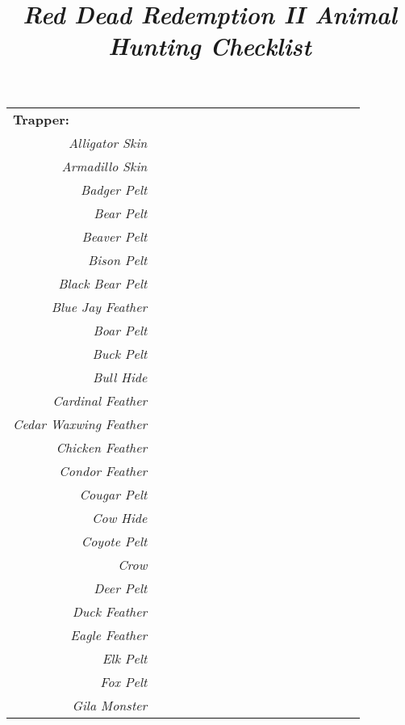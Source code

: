 \documentclass{article}
\title{\textbf{\textit{Red Dead Redemption II Animal Hunting Checklist}}}
\date{}
\begin{document}
\maketitle
\centering
\begin{footnotesize}
\begin{tabular}{|r|c|c|c|c|c|c|c|c|c|c|c|c|c|c|c|c|}
	\cline{0-0}
	\multicolumn{0}{|l|}{\textbf{Trapper:}}\\
	\cline{0-0}
	\cline{0-1}
	\textit{Alligator Skin} & \\
	\cline{0-2}
	\textit{Armadillo Skin} & & \\
	\cline{0-2}
	\textit{Badger Pelt} & & \\
	\cline{0-2}
	\textit{Bear Pelt} & & \\
	\cline{0-11}
	\textit{Beaver Pelt} & & & & & & & & & & & \\
	\cline{0-11}
	\textit{Bison Pelt}& & & \\
	\cline{0-3}
	\textit{Black Bear Pelt} & & & \\
	\cline{0-3}
	\textit{Blue Jay Feather} & & & \\
	\cline{0-10}
	\textit{Boar Pelt} & & & & & & & & & & \\
	\cline{0-10}
	\textit{Buck Pelt} & & & & \\
	\cline{0-4}
	\textit{Bull Hide} & & & \\
	\cline{0-3}
	\textit{Cardinal Feather} & & & \\
	\cline{0-3}
	\textit{Cedar Waxwing Feather} & & \\
	\cline{0-4}
	\textit{Chicken Feather} & & & & \\
	\cline{0-4}
	\textit{Condor Feather} & \\
	\cline{0-4}
	\textit{Cougar Pelt} & & & & \\
	\cline{0-5}
	\textit{Cow Hide} & & & & & \\
	\cline{0-5}
	\textit{Coyote Pelt} & & & \\
	\cline{0-3}
	\textit{Crow} & & \\
	\cline{0-5}
	\textit{Deer Pelt} & & & & & \\
	\cline{0-5}
	\textit{Duck Feather} & & & \\
	\cline{0-4}
	\textit{Eagle Feather} & & & & \\
	\cline{0-5}
	\textit{Elk Pelt} & & & & & \\
	\cline{0-5}
	\textit{Fox Pelt} & & & \\
	\cline{0-3}
	\textit{Gila Monster} & & \\

\end{tabular}
\end{footnotesize}
\end{document}
